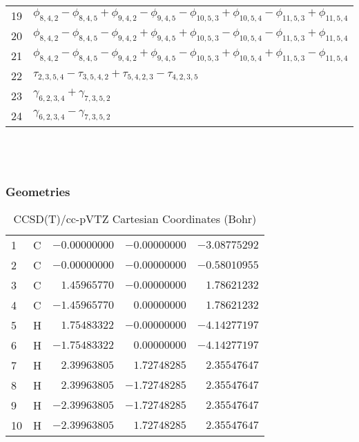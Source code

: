\documentclass[10pt,oneside]{article}
\begin{document}
\begin{table}[h!]
\begin{tabular}{ll}
  19  & $\phi_{8,4,2} - \phi_{8,4,5} + \phi_{9,4,2} - \phi_{9,4,5} - \phi_{10,5,3} + \phi_{10,5,4} - \phi_{11,5,3} + \phi_{11,5,4}$ \\
  20  & $\phi_{8,4,2} - \phi_{8,4,5} - \phi_{9,4,2} + \phi_{9,4,5} + \phi_{10,5,3} - \phi_{10,5,4} - \phi_{11,5,3} + \phi_{11,5,4}$ \\
  21  & $\phi_{8,4,2} - \phi_{8,4,5} - \phi_{9,4,2} + \phi_{9,4,5} - \phi_{10,5,3} + \phi_{10,5,4} + \phi_{11,5,3} - \phi_{11,5,4}$ \\
  22  & $\tau_{2,3,5,4} - \tau_{3,5,4,2} + \tau_{5,4,2,3} - \tau_{4,2,3,5}$ \\
  23  & $\gamma_{6,2,3,4} + \gamma_{7,3,5,2}$ \\
  24  & $\gamma_{6,2,3,4} - \gamma_{7,3,5,2}$ \\
\end{tabular}
\end{table}

\clearpage

\subsection{\ \ \ }

\subsubsection*{Geometries}
\begin{table}[h!]
\centering
\caption{CCSD(T)/cc-pVTZ Cartesian Coordinates (Bohr)}
\begin{tabular}{llrrr}
1  & C  & $-0.00000000$ & $-0.00000000$ & $-3.08775292$ \\
2  & C  & $-0.00000000$ & $-0.00000000$ & $-0.58010955$ \\
3  & C  & $ 1.45965770$ & $-0.00000000$ & $ 1.78621232$ \\
4  & C  & $-1.45965770$ & $ 0.00000000$ & $ 1.78621232$ \\
5  & H  & $ 1.75483322$ & $-0.00000000$ & $-4.14277197$ \\
6  & H  & $-1.75483322$ & $ 0.00000000$ & $-4.14277197$ \\
7  & H  & $ 2.39963805$ & $ 1.72748285$ & $ 2.35547647$ \\
8  & H  & $ 2.39963805$ & $-1.72748285$ & $ 2.35547647$ \\
9  & H  & $-2.39963805$ & $-1.72748285$ & $ 2.35547647$ \\
10 & H  & $-2.39963805$ & $ 1.72748285$ & $ 2.35547647$ \\
\end{tabular}
\end{table}
\end{document}
